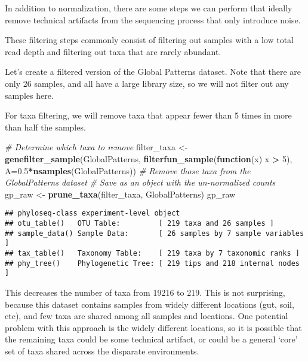 \documentclass[
]{book}
\newenvironment{Shaded}{\begin{snugshade}}{\end{snugshade}}
\newcommand{\CommentTok}[1]{\textcolor[rgb]{0.56,0.35,0.01}{\textit{#1}}}
\newcommand{\ControlFlowTok}[1]{\textcolor[rgb]{0.13,0.29,0.53}{\textbf{#1}}}
\newcommand{\DataTypeTok}[1]{\textcolor[rgb]{0.13,0.29,0.53}{#1}}
\newcommand{\DecValTok}[1]{\textcolor[rgb]{0.00,0.00,0.81}{#1}}
\newcommand{\FloatTok}[1]{\textcolor[rgb]{0.00,0.00,0.81}{#1}}
\newcommand{\KeywordTok}[1]{\textcolor[rgb]{0.13,0.29,0.53}{\textbf{#1}}}
\newcommand{\NormalTok}[1]{#1}
\newcommand{\OperatorTok}[1]{\textcolor[rgb]{0.81,0.36,0.00}{\textbf{#1}}}
\newcommand{\StringTok}[1]{\textcolor[rgb]{0.31,0.60,0.02}{#1}}
\begin{document}
In addition to normalization, there are some steps we can perform that ideally remove technical artifacts from the sequencing process that only introduce noise.

These filtering steps commonly consist of filtering out samples with a low total read depth and filtering out taxa that are rarely abundant.

Let's create a filtered version of the Global Patterns dataset. Note that there are only 26 samples, and all have a large library size, so we will not filter out any samples here.

For taxa filtering, we will remove taxa that appear fewer than 5 times in more than half the samples.

\begin{Shaded}
\begin{Highlighting}[]
\CommentTok{\# Determine which taxa to remove}
\NormalTok{filter\_taxa \textless{}{-}}\StringTok{ }\KeywordTok{genefilter\_sample}\NormalTok{(GlobalPatterns,}
                                 \KeywordTok{filterfun\_sample}\NormalTok{(}\ControlFlowTok{function}\NormalTok{(x) x }\OperatorTok{\textgreater{}}\StringTok{ }\DecValTok{5}\NormalTok{),}
                                 \DataTypeTok{A=}\FloatTok{0.5}\OperatorTok{*}\KeywordTok{nsamples}\NormalTok{(GlobalPatterns))}
\CommentTok{\# Remove those taxa from the GlobalPatterns dataset}
\CommentTok{\# Save as an object with the un{-}normalized counts}
\NormalTok{gp\_raw \textless{}{-}}\StringTok{ }\KeywordTok{prune\_taxa}\NormalTok{(filter\_taxa, GlobalPatterns)}
\NormalTok{gp\_raw}
\end{Highlighting}
\end{Shaded}

\begin{verbatim}
## phyloseq-class experiment-level object
## otu_table()   OTU Table:         [ 219 taxa and 26 samples ]
## sample_data() Sample Data:       [ 26 samples by 7 sample variables ]
## tax_table()   Taxonomy Table:    [ 219 taxa by 7 taxonomic ranks ]
## phy_tree()    Phylogenetic Tree: [ 219 tips and 218 internal nodes ]
\end{verbatim}

This decreases the number of taxa from 19216 to 219. This is not surprising, because this dataset contains samples from widely different locations (gut, soil, etc), and few taxa are shared among all samples and locations. One potential problem with this approach is the widely different locations, so it is possible that the remaining taxa could be some technical artifact, or could be a general `core' set of taxa shared across the disparate environments.
\end{document}
